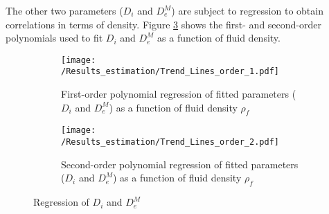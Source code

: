 \documentclass[../Article_Model_Parameters.tex]{subfiles}
\begin{document}
	The other two parameters ($D_i$ and $D_e^M$) are subject to regression to obtain correlations in terms of density. Figure \ref{fig:Regression} shows the first- and second-order polynomials used to fit $D_i$ and $D_e^M$ as a function of fluid density. 
	
	\begin{figure}[!h]
	\centering
	\begin{subfigure}[b]{\columnwidth}
		\centering
		\texttt{[image: /Results\_estimation/Trend\_Lines\_order\_1.pdf]}
		\caption{First-order polynomial regression of fitted parameters ($D_i$ and $D_e^M$) as a function of fluid density $\rho_f$}
		\label{fig:Regression_1}
	\end{subfigure}
	\begin{subfigure}[b]{\columnwidth}
		\centering
		\texttt{[image: /Results\_estimation/Trend\_Lines\_order\_2.pdf]}
		\caption{Second-order polynomial regression of fitted parameters ($D_i$ and $D_e^M$) as a function of fluid density $\rho_f$}
		\label{fig:Regression_2}
	\end{subfigure}
	\caption{Regression of $D_i$ and $D_e^M$} 
	\label{fig:Regression}
	\end{figure}

	
	
\end{document}
